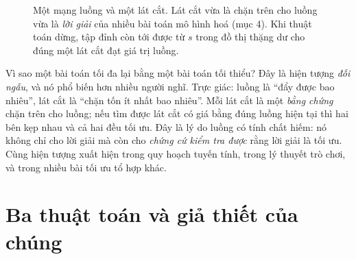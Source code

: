 \documentclass[../../algorithm.tex]{subfiles}
\begin{document}
\begin{figure}[H]\centering
{}
\caption{Một mạng luồng và một lát cắt. Lát cắt vừa là chặn trên cho luồng vừa là \emph{lời giải} của nhiều bài toán mô hình hoá (mục 4). Khi thuật toán dừng, tập đỉnh còn tới được từ \(s\) trong đồ thị thặng dư cho đúng một lát cắt đạt giá trị luồng.}
\label{fig:flow-cut}
\end{figure}

\begin{trucgiac}
Vì sao một bài toán tối đa lại bằng một bài toán tối thiểu? Đây là hiện tượng \emph{đối ngẫu}, và nó phổ biến hơn nhiều người nghĩ. Trực giác: luồng là ``đẩy được bao nhiêu'', lát cắt là ``chặn tốn ít nhất bao nhiêu''. Mỗi lát cắt là một \emph{bằng chứng} chặn trên cho luồng; nếu tìm được lát cắt có giá bằng đúng luồng hiện tại thì hai bên kẹp nhau và cả hai đều tối ưu. Đây là lý do luồng có tính chất hiếm: nó không chỉ cho lời giải mà còn cho \emph{chứng cứ kiểm tra được} rằng lời giải là tối ưu. Cùng hiện tượng xuất hiện trong quy hoạch tuyến tính, trong lý thuyết trò chơi, và trong nhiều bài tối ưu tổ hợp khác.
\end{trucgiac}

\section{Ba thuật toán và giả thiết của chúng}
\end{document}
